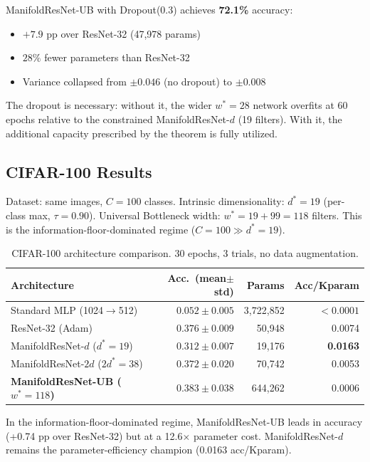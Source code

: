 \documentclass[11pt,letterpaper]{article}
\begin{document}
ManifoldResNet-UB with Dropout(0.3) achieves \textbf{72.1\%} accuracy:
\begin{itemize}[nosep]
  \item $+7.9$ pp over ResNet-32 (47,978 params)
  \item $28\%$ fewer parameters than ResNet-32
  \item Variance collapsed from $\pm 0.046$ (no dropout) to $\pm 0.008$
\end{itemize}

The dropout is necessary: without it, the wider $w^*=28$ network overfits at
60 epochs relative to the constrained ManifoldResNet-$d$ (19 filters).  With
it, the additional capacity prescribed by the theorem is fully utilized.

\subsection{CIFAR-100 Results}

Dataset: same images, $C=100$ classes.
Intrinsic dimensionality: $d^*=19$ (per-class max, $\tau=0.90$).
Universal Bottleneck width: $w^* = 19 + 99 = 118$ filters.
This is the information-floor-dominated regime ($C=100 \gg d^*=19$).

\begin{table}[h]
\centering
\caption{CIFAR-100 architecture comparison. 30 epochs, 3 trials, no data augmentation.}
\label{tab:cifar100}
\begin{tabular}{@{}lrrr@{}}
\toprule
\textbf{Architecture} & \textbf{Acc.\ (mean$\pm$std)} & \textbf{Params} & \textbf{Acc/Kparam} \\
\midrule
Standard MLP (1024$\to$512) & $0.052 \pm 0.005$ & 3,722,852 & $<0.0001$ \\
ResNet-32 (Adam) & $0.376 \pm 0.009$ & 50,948 & 0.0074 \\
ManifoldResNet-$d$ ($d^*=19$) & $0.312 \pm 0.007$ & 19,176 & \textbf{0.0163} \\
ManifoldResNet-$2d$ ($2d^*=38$) & $0.372 \pm 0.020$ & 70,742 & 0.0053 \\
\textbf{ManifoldResNet-UB ($w^*=118$)} & $\mathbf{0.383 \pm 0.038}$ & 644,262 & 0.0006 \\
\bottomrule
\end{tabular}
\end{table}

In the information-floor-dominated regime, ManifoldResNet-UB leads in accuracy
(+0.74 pp over ResNet-32) but at a 12.6$\times$ parameter cost.
ManifoldResNet-$d$ remains the parameter-efficiency champion (0.0163 acc/Kparam).
\end{document}
